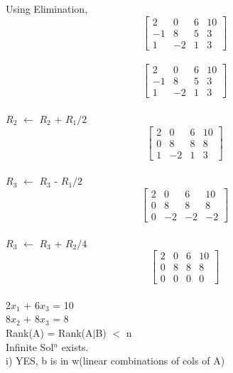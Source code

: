\documentclass{article}
\begin{document}
Using Elimination, \\

    $$
  \left[\begin{array}{rrr|r}
    2 & 0 & 6 & 10 \\
    -1 & 8 & 5 & 3 \\
    1 & -2 & 1 & 3
  \end{array}\right]
$$ \\

  $$
  \left[\begin{array}{rrr|r}
    2 & 0 & 6 & 10 \\
    -1 & 8 & 5 & 3 \\
    1 & -2 & 1 & 3
  \end{array}\right]
$$ \\

$R_2$ $\leftarrow$ $R_2$ + $R_1/2$\\

  $$
  \left[\begin{array}{rrr|r}
    2 & 0 & 6 & 10 \\
    0 & 8 & 8 & 8 \\
    1 & -2 & 1 & 3
  \end{array}\right]
$$ \\

$R_3$ $\leftarrow$ $R_3$ - $R_1/2$\\
  $$
  \left[\begin{array}{rrr|r}
    2 & 0 & 6 & 10 \\
    0 & 8 & 8 & 8 \\
    0 & -2 & -2 & -2
  \end{array}\right]
$$ \\

$R_3$ $\leftarrow$ $R_3$ + $R_2/4$\\

 $$
  \left[\begin{array}{rrr|r}
    2 & 0 & 6 & 10 \\
    0 & 8 & 8 & 8 \\
    0 & 0 & 0 & 0
  \end{array}\right]
$$ \\
2$x_1$ + 6$x_3$ = 10 \\
8$x_2$ + 8$x_3$ = 8 \\

Rank(A) = Rank(A$\mid$B) $<$ n \\

Infinite Sol$^n$ exists. \\

i) YES, b is in w(linear combinations of cols of A) \\
\end{document}

